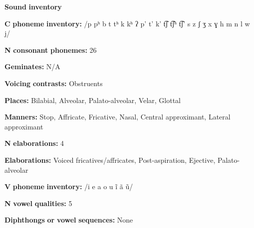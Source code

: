 \documentclass[output=paper]{langsci/langscibook}
\begin{document}
\begin{styleBody}
\textbf{Sound} \textbf{inventory}
\end{styleBody}

\begin{styleBody}
\textbf{C} \textbf{phoneme} \textbf{inventory:} /p pʰ b t tʰ k kʰ ʔ p’ t’ k’ t͡ʃ t͡ʃʰ t͡ʃ’ s z ʃ ʒ x ɣ h m n l w j/
\end{styleBody}

\begin{styleBody}
\textbf{N} \textbf{consonant} \textbf{phonemes:} 26
\end{styleBody}

\begin{styleBody}
\textbf{Geminates:} N/A
\end{styleBody}

\begin{styleBody}
\textbf{Voicing} \textbf{contrasts:} Obstruents
\end{styleBody}

\begin{styleBody}
\textbf{Places:} Bilabial, Alveolar, Palato-alveolar, Velar, Glottal
\end{styleBody}

\begin{styleBody}
\textbf{Manners:} Stop, Affricate, Fricative, Nasal, Central approximant, Lateral approximant
\end{styleBody}

\begin{styleBody}
\textbf{N} \textbf{elaborations:} 4
\end{styleBody}

\begin{styleBody}
\textbf{Elaborations:} Voiced fricatives/affricates, Post-aspiration, Ejective, Palato-alveolar
\end{styleBody}

\begin{styleBody}
\textbf{V} \textbf{phoneme} \textbf{inventory:} /i e a o u ĩ ã ũ/
\end{styleBody}

\begin{styleBody}
\textbf{N} \textbf{vowel} \textbf{qualities:} 5
\end{styleBody}

\begin{styleBody}
\textbf{Diphthongs} \textbf{or} \textbf{vowel} \textbf{sequences:} None
\end{styleBody}
\end{document}
